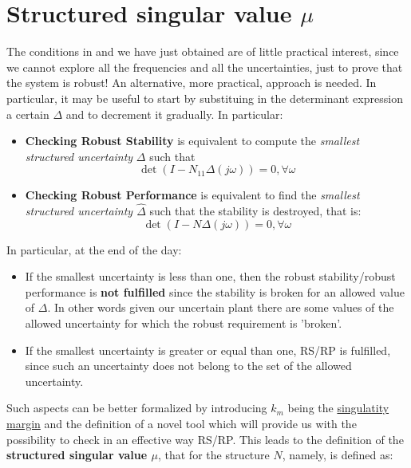 \documentclass[a4paper, 12pt]{article}
\begin{document}
\section{Structured singular value $\mu$}
The conditions in  and  we have just obtained are of little practical interest, since we cannot explore all the frequencies and all the uncertainties, just to prove that the system is robust! An alternative, more practical, approach is needed. In particular, it may be useful to start by substituing in the determinant expression a certain $\Delta$ and to decrement it gradually. In particular: 
\begin{itemize}
    \item \textbf{Checking Robust Stability} is equivalent to compute the \textit{smallest structured uncertainty} $\Delta$ such that 
    \begin{equation}
        \det(I-N_{11}\Delta(j\omega))=0, \forall \omega
    \end{equation}
    \item \textbf{Checking Robust Performance} is equivalent to find the \textit{smallest structured uncertainty $\hat{\Delta}$} such that the stability is destroyed, that is: 
    \begin{equation}
        \det(I-N\Delta(j\omega))=0, \forall \omega
    \end{equation}
\end{itemize}
In particular, at the end of the day:
\begin{itemize}
    \item If the smallest uncertainty is less than one, then the robust stability/robust performance is \textbf{not fulfilled} since the stability is broken for an allowed value of $\Delta$. In other words given our uncertain plant there are some values of the allowed uncertainty for which the robust requirement is 'broken'.
    \item If the smallest uncertainty is greater or equal than one, RS/RP is fulfilled, since such an uncertainty does not belong to the set of the allowed uncertainty.
\end{itemize}

\noindent
Such aspects can be better formalized by introducing $k_m$ being the \underline{singulatity margin} and the definition of a novel tool which will provide us with the possibility to check in an effective way RS/RP. This leads to the definition of the \textbf{structured singular value $\mu$}, that for the structure $N$, namely, is defined as:
\end{document}
